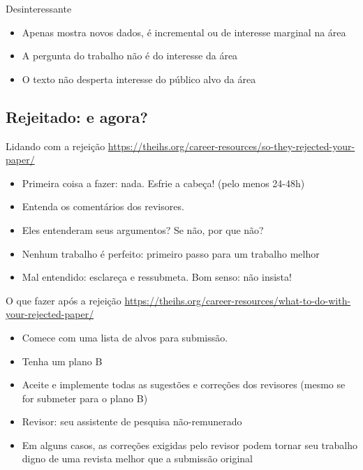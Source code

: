 \documentclass{beamer}
\begin{document}
\begin{frame}{Desinteressante}
  \begin{itemize}
  \item Apenas mostra novos dados, é incremental ou de interesse
    marginal na área
  \item A pergunta do trabalho não é do interesse da área
  \item O texto não desperta interesse do público alvo da área
  \end{itemize}
\end{frame}

\subsection{Rejeitado: e agora?}


\begin{frame}{Lidando com a rejeição}
  \url{https://theihs.org/career-resources/so-they-rejected-your-paper/}

  \begin{itemize}
  \item Primeira coisa a fazer: nada. Esfrie a cabeça! (pelo menos 24-48h)
  \item Entenda os comentários dos revisores.
  \item Eles entenderam seus argumentos? Se não, por que não?
  \item Nenhum trabalho é perfeito: primeiro passo para um trabalho
    melhor
  \item Mal entendido: esclareça e ressubmeta. Bom senso: não insista!
  \end{itemize}
\end{frame}

\begin{frame}{O que fazer após a rejeição}
  \url{https://theihs.org/career-resources/what-to-do-with-your-rejected-paper/}
  \begin{itemize}
  \item Comece com uma lista de alvos para submissão.
  \item Tenha um plano B
  \item Aceite e implemente todas as sugestões e correções dos
    revisores (mesmo se for submeter para o plano B)
  \item Revisor: seu assistente de pesquisa não-remunerado
  \item Em alguns casos, as correções exigidas pelo revisor podem
    tornar seu trabalho digno de uma revista melhor que a submissão original
  \end{itemize}
\end{frame}
\end{document}
